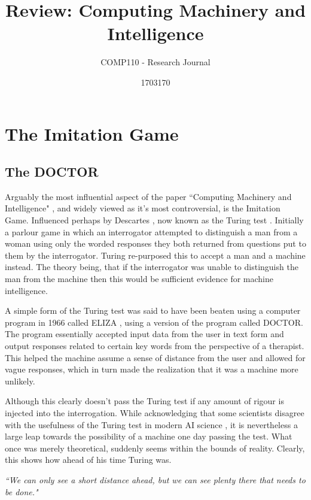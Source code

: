 \documentclass{scrartcl}
\title{Review: Computing Machinery and Intelligence
}
\subtitle{COMP110 - Research Journal}
\author{1703170}
\begin{document}
\maketitle

\section{The Imitation Game}

\subsection{The DOCTOR}

Arguably the most influential aspect of the paper \textquotedblleft Computing Machinery and Intelligence" \cite{turing1950computing:1}, and widely viewed as it's most controversial, is the Imitation Game. Influenced perhaps by Descartes \cite{descartes1996discourse:2}, now known as the Turing test \cite[p.17]{suchman1987plans:3}. Initially a parlour game in which an interrogator attempted to distinguish a man from a woman using only the worded responses they both returned from questions put to them by the interrogator. Turing re-purposed this to accept a man and a machine instead. The theory being, that if the interrogator was unable to distinguish the man from the machine then this would be sufficient evidence for machine intelligence.

A simple form of the Turing test was said to have been beaten using a computer program in 1966 called ELIZA \cite{weizenbaum1966eliza:4}, using a version of the program called DOCTOR. The program essentially accepted input data from the user in text form and output responses related to certain key words from the perspective of a therapist. This helped the machine assume a sense of distance from the user and allowed for vague responses, which in turn made the realization that it was a machine more unlikely.

Although this clearly doesn't pass the Turing test if any amount of rigour is injected into the interrogation. While acknowledging that some scientists disagree with the usefulness of the Turing test in modern AI science \cite{hayes1995turing:5}, it is nevertheless a large leap towards the possibility of a machine one day passing the test. What once was merely theoretical, suddenly seems within the bounds of reality. Clearly, this shows how ahead of his time Turing was.

\textit{\textquotedblleft We can only see a short distance ahead, but we can see plenty there that needs to be done."} 
\end{document}
